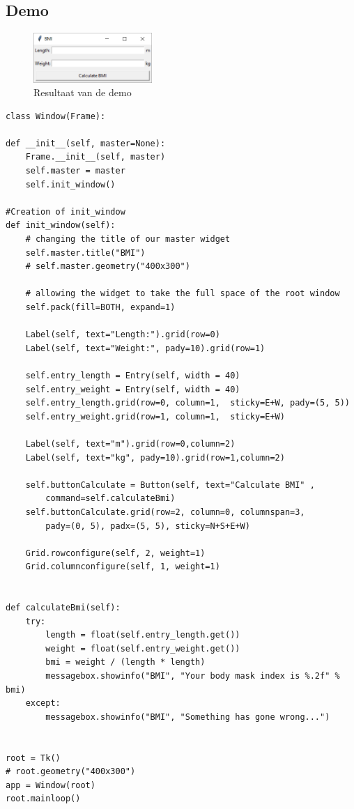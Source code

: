 \documentclass{article}
\begin{document}
\subsection{Demo}

\begin{figure}[H]
    \centering
    \includegraphics[width=0.4\textwidth]{tkinter-demo.png}
    \caption{Resultaat van de demo}
\end{figure}

\begin{verbatim}
class Window(Frame):

def __init__(self, master=None):
    Frame.__init__(self, master)
    self.master = master
    self.init_window()

#Creation of init_window
def init_window(self):
    # changing the title of our master widget
    self.master.title("BMI")
    # self.master.geometry("400x300")

    # allowing the widget to take the full space of the root window
    self.pack(fill=BOTH, expand=1)

    Label(self, text="Length:").grid(row=0)
    Label(self, text="Weight:", pady=10).grid(row=1)

    self.entry_length = Entry(self, width = 40)
    self.entry_weight = Entry(self, width = 40)
    self.entry_length.grid(row=0, column=1,  sticky=E+W, pady=(5, 5))
    self.entry_weight.grid(row=1, column=1,  sticky=E+W)

    Label(self, text="m").grid(row=0,column=2)
    Label(self, text="kg", pady=10).grid(row=1,column=2)

    self.buttonCalculate = Button(self, text="Calculate BMI" , 
        command=self.calculateBmi)
    self.buttonCalculate.grid(row=2, column=0, columnspan=3, 
        pady=(0, 5), padx=(5, 5), sticky=N+S+E+W)

    Grid.rowconfigure(self, 2, weight=1)
    Grid.columnconfigure(self, 1, weight=1)


def calculateBmi(self):
    try:
        length = float(self.entry_length.get())
        weight = float(self.entry_weight.get())
        bmi = weight / (length * length)
        messagebox.showinfo("BMI", "Your body mask index is %.2f" % bmi)
    except:
        messagebox.showinfo("BMI", "Something has gone wrong...")


root = Tk()
# root.geometry("400x300")
app = Window(root)
root.mainloop()
\end{verbatim}
\end{document}
